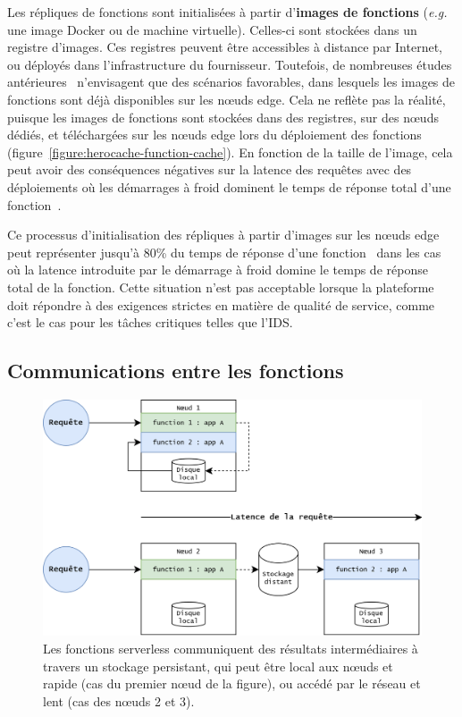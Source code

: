 Les répliques de fonctions sont initialisées à partir d'\textbf{images de fonctions} (\textit{e.g.} une image Docker ou de machine virtuelle). Celles-ci sont stockées dans un registre d'images. Ces registres peuvent être accessibles à distance par Internet, ou déployés dans l'infrastructure du fournisseur. Toutefois, de nombreuses études antérieures~\cite{bhasiCypressInputSizesensitive2022, zijunFassflowEfficient2022, smithFaDOFaaSFunctions2022, zhangFIRSTExploitingMultiDimensional2023} n'envisagent que des scénarios favorables, dans lesquels les images de fonctions sont déjà disponibles sur les nœuds edge. Cela ne reflète pas la réalité, puisque les images de fonctions sont stockées dans des registres, sur des nœuds dédiés, et téléchargées sur les nœuds edge lors du déploiement des fonctions (figure~\ref{figure:herocache-function-cache}). En fonction de la taille de l'image, cela peut avoir des conséquences négatives sur la latence des requêtes avec des déploiements où les démarrages à froid dominent le temps de réponse total d'une fonction~\cite{yanHermesEfficientCache2020}.

Ce processus d'initialisation des répliques à partir d'images sur les nœuds edge peut représenter jusqu'à 80\% du temps de réponse d'une fonction~\cite{yanHermesEfficientCache2020} dans les cas où la latence introduite par le démarrage à froid domine le temps de réponse total de la fonction. Cette situation n'est pas acceptable lorsque la plateforme doit répondre à des exigences strictes en matière de qualité de service, comme c'est le cas pour les tâches critiques telles que l'\gls{IDS}.

\subsection{Communications entre les fonctions}
\label{section:herocache-background-communications}

\begin{figure}[!ht]
    \centering
    \includegraphics[width=0.8\columnwidth]{5_Chapitre5/figures/function-communications.png}
    \caption{Les fonctions serverless communiquent des résultats intermédiaires à travers un stockage persistant, qui peut être local aux nœuds et rapide (cas du premier nœud de la figure), ou accédé par le réseau et lent (cas des nœuds 2 et 3).}
    \label{figure:herocache-function-communications}
\end{figure}

